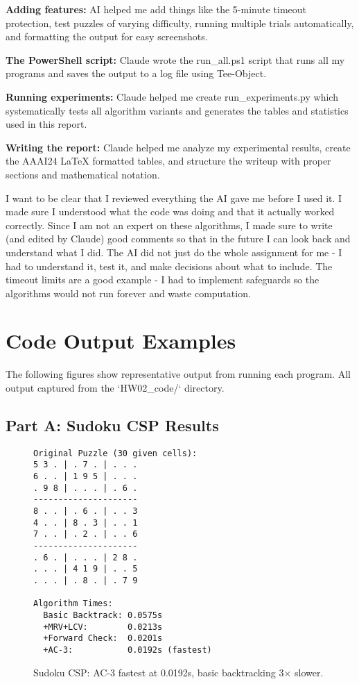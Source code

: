 \documentclass[letterpaper]{article}
\begin{document}
\textbf{Adding features:} AI helped me add things like the 5-minute timeout protection, test puzzles of varying difficulty, running multiple trials automatically, and formatting the output for easy screenshots.

\textbf{The PowerShell script:} Claude wrote the run\_all.ps1 script that runs all my programs and saves the output to a log file using Tee-Object.

\textbf{Running experiments:} Claude helped me create run\_experiments.py which systematically tests all algorithm variants and generates the tables and statistics used in this report.

\textbf{Writing the report:} Claude helped me analyze my experimental results, create the AAAI24 LaTeX formatted tables, and structure the writeup with proper sections and mathematical notation.

I want to be clear that I reviewed everything the AI gave me before I used it. I made sure I understood what the code was doing and that it actually worked correctly. Since I am not an expert on these algorithms, I made sure to write (and edited by Claude) good comments so that in the future I can look back and understand what I did. The AI did not just do the whole assignment for me - I had to understand it, test it, and make decisions about what to include. The timeout limits are a good example - I had to implement safeguards so the algorithms would not run forever and waste computation.

\section{Code Output Examples}

The following figures show representative output from running each program. All output captured from the `HW02\_code/` directory.

\subsection{Part A: Sudoku CSP Results}

\begin{figure}[h]
\begin{scriptsize}
\begin{verbatim}
Original Puzzle (30 given cells):
5 3 . | . 7 . | . . .
6 . . | 1 9 5 | . . .
. 9 8 | . . . | . 6 .
---------------------
8 . . | . 6 . | . . 3
4 . . | 8 . 3 | . . 1
7 . . | . 2 . | . . 6
---------------------
. 6 . | . . . | 2 8 .
. . . | 4 1 9 | . . 5
. . . | . 8 . | . 7 9

Algorithm Times:
  Basic Backtrack: 0.0575s
  +MRV+LCV:        0.0213s
  +Forward Check:  0.0201s
  +AC-3:           0.0192s (fastest)
\end{verbatim}
\end{scriptsize}
\caption{Sudoku CSP: AC-3 fastest at 0.0192s, basic backtracking 3× slower.}
\label{fig:sudoku-csp}
\end{figure}
\end{document}
